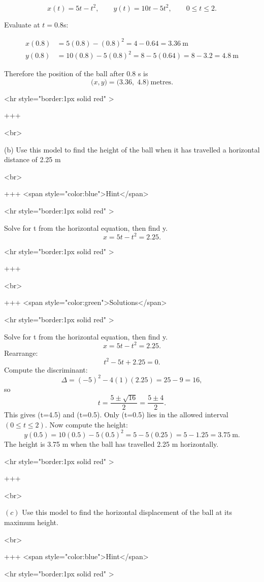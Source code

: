 $$
x(t)=5t-t^{2},\qquad y(t)=10t-5t^{2},\qquad 0\le t\le 2.
$$

Evaluate at $t=0.8$s:

$$
\begin{align*}
x(0.8) &= 5(0.8) - (0.8)^2 = 4 - 0.64 = 3.36\ \text{m}\\
y(0.8) &= 10(0.8) - 5(0.8)^2 = 8 - 5(0.64) = 8 - 3.2 = 4.8\ \text{m}
\end{align*}
$$

Therefore the position of the ball after $0.8$ s is
$$
\bigl(x,y\bigr) = \bigl(3.36,\;4.8\bigr)\ \text{metres}.
$$

<hr style="border:1px solid red" >

+++

<br>

(b) Use this model to find the height of the ball when it has travelled a horizontal distance of 2.25 m

<br>

+++ <span style="color:blue">Hint</span>

<hr style="border:1px solid red" >

Solve for t from the horizontal equation, then find y.
$$
x=5t-t^{2}=2.25.
$$

<hr style="border:1px solid red" >

+++

<br>

+++ <span style="color:green">Solutions</span>

<hr style="border:1px solid red" >

Solve for t from the horizontal equation, then find y.
$$
x=5t-t^{2}=2.25.
$$
Rearrange:
$$
t^{2}-5t+2.25=0.
$$
Compute the discriminant:
$$
\Delta=(-5)^{2}-4(1)(2.25)=25-9=16,
$$
so
$$
t=\frac{5\pm\sqrt{16}}{2}=\frac{5\pm4}{2}.
$$
This gives (t=4.5) and (t=0.5). Only (t=0.5) lies in the allowed interval $(0\le t\le2)$.
Now compute the height:
$$
y(0.5)=10(0.5)-5(0.5)^{2}=5-5(0.25)=5-1.25=3.75\ \text{m}.
$$
The height is 3.75 m when the ball has travelled 2.25 m horizontally.

<hr style="border:1px solid red" >

+++

<br>


\((c)\) Use this model to find the horizontal displacement of the ball at its maximum height.

<br>

+++ <span style="color:blue">Hint</span>

<hr style="border:1px solid red" >


